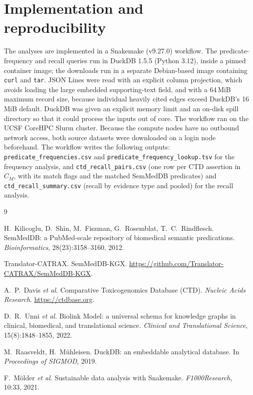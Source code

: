 \documentclass[11pt]{article}
\newcommand{\code}[1]{\texttt{#1}}
\begin{document}
\section{Implementation and reproducibility}

The analyses are implemented in a Snakemake (v9.27.0) workflow. The
predicate-frequency and recall queries run in DuckDB 1.5.5 (Python 3.12),
inside a pinned container image; the downloads run in a separate Debian-based
image containing \code{curl} and \code{tar}. JSON Lines were read with an
explicit column projection, which avoids loading the large embedded
supporting-text field, and with a 64\,MiB maximum record size, because
individual heavily cited edges exceed DuckDB's 16\,MiB default. DuckDB was
given an explicit memory limit and an on-disk spill directory so that it could
process the inputs out of core. The workflow ran on the UCSF CoreHPC Slurm
cluster. Because the compute nodes have no outbound network access, both
source datasets were downloaded on a login node beforehand. The workflow
writes the following outputs:
\code{predicate\_frequencies.csv} and
\code{predicate\_frequency\_lookup.tsv} for the frequency analysis, and
\code{ctd\_recall\_pairs.csv} (one row per CTD assertion in $C_M$, with its
match flags and the matched SemMedDB predicates) and
\code{ctd\_recall\_summary.csv} (recall by evidence type and pooled) for the
recall analysis.

\begin{thebibliography}{9}

H.~Kilicoglu, D.~Shin, M.~Fiszman, G.~Rosemblat, T.~C.~Rindflesch.
SemMedDB: a PubMed-scale repository of biomedical semantic predications.
\emph{Bioinformatics}, 28(23):3158--3160, 2012.

Translator-CATRAX. SemMedDB-KGX.
\url{https://github.com/Translator-CATRAX/SemMedDB-KGX}.

A.~P.~Davis \emph{et al.}
Comparative Toxicogenomics Database (CTD).
\emph{Nucleic Acids Research}. \url{https://ctdbase.org}.

D.~R.~Unni \emph{et al.}
Biolink Model: a universal schema for knowledge graphs in clinical,
biomedical, and translational science.
\emph{Clinical and Translational Science}, 15(8):1848--1855, 2022.

M.~Raasveldt, H.~M\"uhleisen.
DuckDB: an embeddable analytical database.
In \emph{Proceedings of SIGMOD}, 2019.

F.~M\"older \emph{et al.}
Sustainable data analysis with Snakemake.
\emph{F1000Research}, 10:33, 2021.

\end{thebibliography}
\end{document}
